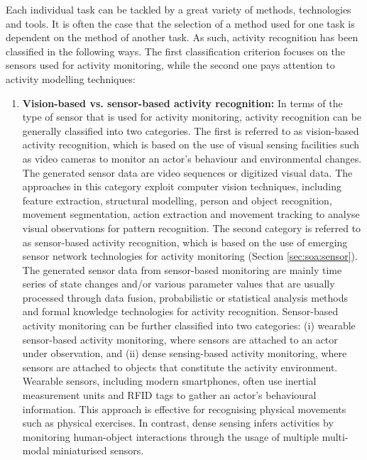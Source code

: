 Each individual task can be tackled by a great variety of methods, technologies and tools. It is often the case that the selection of a method used for one task is dependent on the method of another task. As such, activity recognition has been classified in the following ways. The first classification criterion focuses on the sensors used for activity monitoring, while the second one pays attention to activity modelling techniques:

\begin{enumerate}
 \item \textbf{Vision-based vs. sensor-based activity recognition:} In terms of the type of sensor that is used for activity monitoring, activity recognition can be generally classified into two categories. The first is referred to as vision-based activity recognition, which is based on the use of visual sensing facilities such as video cameras to monitor an actor’s behaviour and environmental changes. The generated sensor data are video sequences or digitized visual data. The approaches in this category exploit computer vision techniques, including feature extraction, structural modelling, person and object recognition, movement segmentation, action extraction and movement tracking to analyse visual observations for pattern recognition. The second category is referred to as sensor-based activity recognition, which is based on the use of emerging sensor network technologies for activity monitoring (Section \ref{sec:soa:sensor}). The generated sensor data from sensor-based monitoring are mainly time series of state changes and/or various parameter values that are usually processed through data fusion, probabilistic or statistical analysis methods and formal knowledge technologies for activity recognition. Sensor-based activity monitoring can be further classified into two categories: (i) wearable sensor-based activity monitoring, where sensors are attached to an actor under observation, and (ii) dense sensing-based activity monitoring, where sensors are attached to objects that constitute the activity environment. Wearable sensors, including modern smartphones, often use inertial measurement units and RFID tags to gather an actor’s behavioural information. This approach is effective for recognising physical movements such as physical exercises. In contrast, dense sensing infers activities by monitoring human-object interactions through the usage of multiple multi-modal miniaturised sensors.


\end{enumerate}
